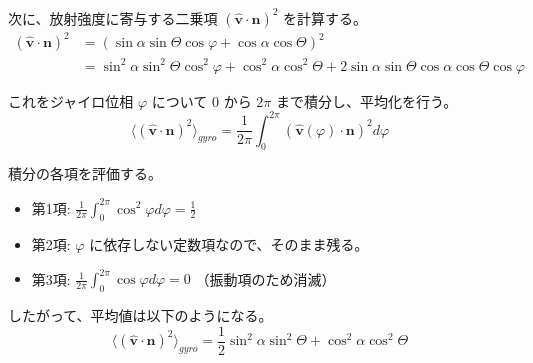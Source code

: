 \documentclass[a4paper,11pt]{bxjsarticle} %
\begin{document}
次に、放射強度に寄与する二乗項 $(\hat{\bm{v}} \cdot \bm{n})^2$ を計算する。
\begin{align}
    (\hat{\bm{v}} \cdot \bm{n})^2 &= (\sin\alpha \sin\Theta \cos\varphi + \cos\alpha \cos\Theta)^2 \\
    &= \sin^2\alpha \sin^2\Theta \cos^2\varphi + \cos^2\alpha \cos^2\Theta + 2 \sin\alpha \sin\Theta \cos\alpha \cos\Theta \cos\varphi
\end{align}

これをジャイロ位相 $\varphi$ について $0$ から $2\pi$ まで積分し、平均化を行う。
\begin{equation}
    \langle (\hat{\bm{v}} \cdot \bm{n})^2 \rangle_{gyro} = \frac{1}{2\pi} \int_0^{2\pi} (\hat{\bm{v}}(\varphi) \cdot \bm{n})^2 d\varphi
\end{equation}

積分の各項を評価する。
\begin{itemize}
    \item 第1項: $\frac{1}{2\pi} \int_0^{2\pi} \cos^2\varphi d\varphi = \frac{1}{2}$
    \item 第2項: $\varphi$ に依存しない定数項なので、そのまま残る。
    \item 第3項: $\frac{1}{2\pi} \int_0^{2\pi} \cos\varphi d\varphi = 0$ （振動項のため消滅）
\end{itemize}

したがって、平均値は以下のようになる。
\begin{equation}
    \langle (\hat{\bm{v}} \cdot \bm{n})^2 \rangle_{gyro} = \frac{1}{2} \sin^2\alpha \sin^2\Theta + \cos^2\alpha \cos^2\Theta
\end{equation}



\end{document}

